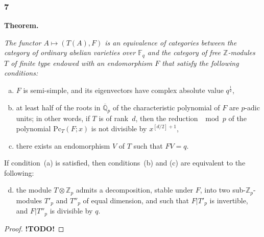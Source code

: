 \documentclass{article}
\newcommand{\FF}{\mathbb{F}}
\newcommand{\ZZ}{\mathbb{Z}}
\newcommand{\QQ}{\mathbb{Q}}
\newcommand{\Pc}{\mathrm{Pc}}
\newcommand{\todo}{\textbf{ !TODO! }}
\newcommand{\oldpage}[1]{\marginpar{\footnotesize$\Big\vert$ \textit{p.~#1}}}
\begin{document}
\subsubsection*{7}
\label{7}
\textbf{Theorem.}
{\itshape
  The functor $A\mapsto(T(A),F)$ is an equivalence of categories between the category of ordinary abelian varieties over $\FF_q$ and the category of free $\ZZ$-modules $T$ of finite type endowed with an endomorphism $F$ that satisfy the following conditions:
\oldpage{241}
  \begin{enumerate}[(a)]
    \item $F$ is semi-simple, and its eigenvectors have complex absolute value $q^{\frac12}$,
    \item at least half of the roots in $\overline{\QQ}_p$ of the characteristic polynomial of $F$ are $p$-adic units;
      in other words, if $T$ is of rank~$d$, then the reduction $\mod p$ of the polynomial $\Pc_T(F;x)$ is not divisible by $x^{[d/2]+1}$,
    \item there exists an endomorphism $V$ of $T$ such that $FV=q$.
  \end{enumerate}

  If condition~(a) is satisfied, then conditions~(b) and (c) are equivalent to the following:
  \begin{enumerate}[(a)]
  \setcounter{enumi}{3}
    \item the module $T\otimes\ZZ_p$ admits a decomposition, stable under $F$, into two sub-$\ZZ_p$-modules $T'_p$ and $T''_p$ of equal dimension, and such that $F|T'_p$ is invertible, and $F|T''_p$ is divisible by $q$.
  \end{enumerate}
}

\begin{proof}
  \todo
\end{proof}



\nocite{*}
\end{document}

